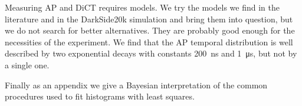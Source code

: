 \documentclass[11pt]{article}
\begin{document}
    Measuring AP and DiCT requires models. We try the models we find in the
    literature and in the DarkSide20k simulation and bring them into question,
    but we do not search for better alternatives. They are probably good enough
    for the necessities of the experiment. We find that the AP temporal
    distribution is well described by two exponential decays with constants
    \SI{200}{ns} and \SI{1}{\micro s}, but not by a single one.
    
    Finally as an appendix we give a Bayesian interpretation of the common
    procedures used to fit histograms with least squares.
    
\end{document}
